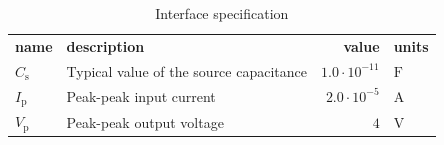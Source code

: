 \begin{table}[h]
\centering
\begin{tabular}[c]{llrl}
\textbf{name} & \textbf{description} & \textbf{value} & \textbf{units} \\ 
\rowcolor{myyellow}
$C_{\mathrm{s}}$ &\small{Typical value of the source capacitance} &$1.0 \cdot 10^{-11}$ &$\mathrm{F}$ \\ 
$I_{\mathrm{p}}$ &\small{Peak-peak input current} &$2.0 \cdot 10^{-5}$ &$\mathrm{A}$ \\ 
\rowcolor{myyellow}
$V_{\mathrm{p}}$ &\small{Peak-peak output voltage} &$4$ &$\mathrm{V}$ \\ 
\end{tabular}
\caption{Interface specification}
\end{table}


